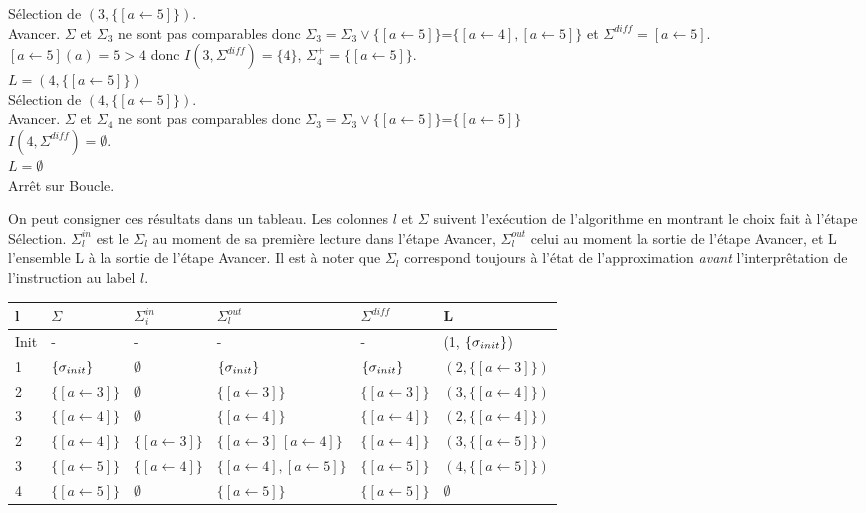 \begin{tabbing}
Sélection de $(3,\{[a\leftarrow 5]\})$.\\
Avancer. \> $\Sigma$ et $\Sigma_3$ ne sont pas comparables donc $\Sigma_3=\Sigma_3\vee\{[a\leftarrow 5]\}$=$\{[a\leftarrow 4],[a\leftarrow 5]\}$ et $\Sigma^{diff}=[a\leftarrow 5].$\\
\> $[a\leftarrow 5](a)=5>4$ donc $I(3,\Sigma^{diff})=\{4\}$, $\Sigma^+_4=\{[a\leftarrow 5]\}$.\\
\> $L=(4,\{[a\leftarrow 5]\})$\\

Sélection de $(4,\{[a\leftarrow 5]\})$.\\
Avancer. \> $\Sigma$ et $\Sigma_4$ ne sont pas comparables donc $\Sigma_3=\Sigma_3\vee\{[a\leftarrow 5]\}$=$\{[a\leftarrow 5]\}$\\
\> $I(4,\Sigma^{diff})=\emptyset$.\\
\> $L=\emptyset$\\
Arrêt sur Boucle.

\end{tabbing}

On peut consigner ces résultats dans un tableau. Les colonnes $l$ et $\Sigma$ suivent l'exécution de l'algorithme en montrant le choix fait à l'étape Sélection. $\Sigma^{in}_l$ est le $\Sigma_l$ au moment de sa première lecture dans l'étape Avancer, $\Sigma^{out}_l$ celui au moment la sortie de l'étape Avancer, et L l'ensemble L à la sortie de l'étape Avancer.
Il est à noter que $\Sigma_l$ correspond toujours à l'état de l'approximation \emph{avant} l'interprêtation de l'instruction au label $l$.\\ 

\begin{tabular}{|l|l|l|l|l|l|}
 \hline 
 l & $\Sigma$ & $\Sigma^{in}_i$ & $\Sigma^{out}_l$ & $\Sigma^{diff}$ & L\\
 \hline
 Init & - & - & - & - & (1, $\{\sigma_{init}\}$)\\
 1 & $\{\sigma_{init}\}$ & $\emptyset$ & $\{\sigma_{init}\}$ & $\{\sigma_{init}\}$ & $(2,\{[a\leftarrow 3]\})$\\
 2 & $\{[a\leftarrow 3]\}$ & $\emptyset$ & $\{[a\leftarrow 3]\}$ &  $\{[a\leftarrow 3]\}$ &  $(3,\{[a\leftarrow 4]\})$\\
 3 & $\{[a\leftarrow 4]\}$ & $\emptyset$ & $\{[a\leftarrow 4]\}$ &  $\{[a\leftarrow 4]\}$ &  $(2,\{[a\leftarrow 4]\})$\\
 2 & $\{[a\leftarrow 4]\}$ & $\{[a\leftarrow 3]\}$ & $\{[a\leftarrow 3]\, [a\leftarrow 4]\}$ &  $\{[a\leftarrow 4]\}$ &  $(3,\{[a\leftarrow 5]\})$\\
 3 & $\{[a\leftarrow 5]\}$ & $\{[a\leftarrow 4]\}$ & $\{[a\leftarrow 4],[a\leftarrow 5]\}$ &  $\{[a\leftarrow 5]\}$ &  $(4,\{[a\leftarrow 5]\})$\\
 4 & $\{[a\leftarrow 5]\}$ & $\emptyset$ & $\{[a\leftarrow 5]\}$ &  $\{[a\leftarrow 5]\}$ &  $\emptyset$\\
 \hline
\end{tabular}

